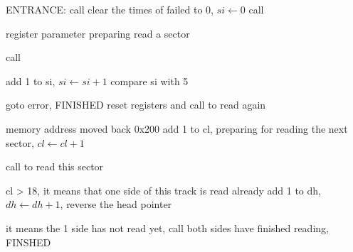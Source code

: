 \documentclass{standalone}
\begin{document}
\begin{algorithm}[H]
  \SetAlgoLined

  ENTRANCE: call \readloop{}\;
  \myproc{\readloop{}}
  {
    clear the times of failed to 0, $si \leftarrow 0$\;
    call \retry{}\;
  }

  \myproc{\retry{}}
  {
    register parameter preparing\;
    read a sector\;

    {
      call \next{}\;
    }
    {
      add 1 to si, $si \leftarrow si + 1$\;
      compare si with 5\;
      
      {
        goto error, FINISHED\;
      }
      {
        reset registers and call \retry{} to read again\;
      }
    }
  }

  \myproc{\next{}}
  {
    memory address moved back 0x200\;
    add 1 to cl, preparing for reading the next sector, $cl \leftarrow cl + 1$\;

    {
      call \readloop{} to read this sector\;
    }
    {
      cl > 18, it means that one side of this track is read already\;
      add 1 to dh, $dh \leftarrow dh + 1$, reverse the head pointer\;
    
    
      {
        it means the 1 side has not read yet, call \readloop{}\;
      }
      {
        both sides have finished reading, FINSHED\;
      }
    }
  }
  
\end{algorithm}
\end{document}
